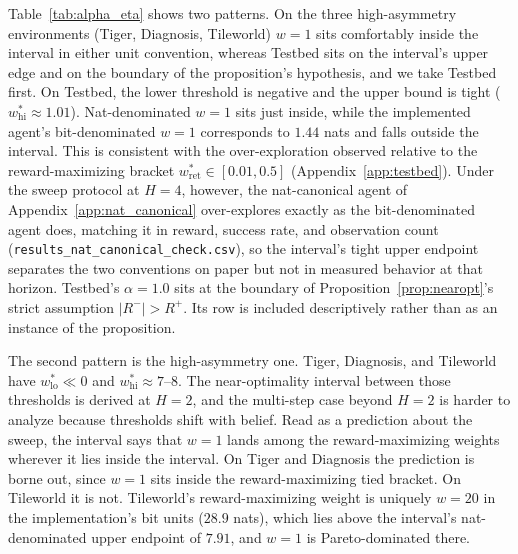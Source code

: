 Table~\ref{tab:alpha_eta} shows two patterns. On the three high-asymmetry environments (Tiger, Diagnosis, Tileworld) $w{=}1$ sits comfortably inside the interval in either unit convention, whereas Testbed sits on the interval's upper edge and on the boundary of the proposition's hypothesis, and we take Testbed first. On Testbed, the lower threshold is negative and the upper bound is tight ($w^*_{\mathrm{hi}} \approx 1.01$). Nat-denominated $w{=}1$ sits just inside, while the implemented agent's bit-denominated $w{=}1$ corresponds to $1.44$ nats and falls outside the interval. This is consistent with the over-exploration observed relative to the reward-maximizing bracket $w^*_{\mathrm{ret}} \in [0.01, 0.5]$ (Appendix~\ref{app:testbed}). Under the sweep protocol at $H{=}4$, however, the nat-canonical agent of Appendix~\ref{app:nat_canonical} over-explores exactly as the bit-denominated agent does, matching it in reward, success rate, and observation count (\texttt{results\_\allowbreak nat\_\allowbreak canonical\_\allowbreak check.csv}), so the interval's tight upper endpoint separates the two conventions on paper but not in measured behavior at that horizon. Testbed's $\alpha{=}1.0$ sits at the boundary of Proposition~\ref{prop:nearopt}'s strict assumption $|R^-| > R^+$. Its row is included descriptively rather than as an instance of the proposition.

The second pattern is the high-asymmetry one. Tiger, Diagnosis, and Tileworld have $w^*_{\mathrm{lo}} \ll 0$ and $w^*_{\mathrm{hi}} \approx 7$--$8$. The near-optimality interval between those thresholds is derived at $H{=}2$, and the multi-step case beyond $H{=}2$ is harder to analyze because thresholds shift with belief. Read as a prediction about the sweep, the interval says that $w{=}1$ lands among the reward-maximizing weights wherever it lies inside the interval. On Tiger and Diagnosis the prediction is borne out, since $w{=}1$ sits inside the reward-maximizing tied bracket. On Tileworld it is not. Tileworld's reward-maximizing weight is uniquely $w{=}20$ in the implementation's bit units ($28.9$ nats), which lies above the interval's nat-denominated upper endpoint of $7.91$, and $w{=}1$ is Pareto-dominated there.

